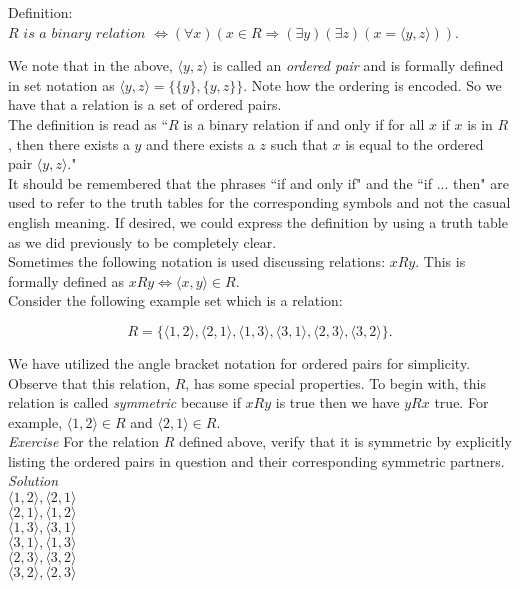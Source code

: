 Definition:  $R \textit{ is a binary relation } \Longleftrightarrow (\forall x) (x \in R \Longrightarrow (\exists y)(\exists z)(x=\langle y,z \rangle))$.

We note that in the above, $\langle y, z \rangle$ is called an \textit{ordered pair} and is formally defined in set notation as $\langle y, z \rangle = \{\{y\}, \{y,z\}\}$.  Note how the ordering is encoded.  So we have that a relation is a set of ordered pairs.\\

The definition is read as ``$R$ is a binary relation if and only if for all $x$ if $x$ is in $R$, then there exists a $y$ and there exists a $z$ such that $x$ is equal to the ordered pair $\langle y, z \rangle$." \\

It should be remembered that the phrases ``if and only if" and the ``if ... then" are used to refer to the truth tables for the corresponding symbols and not the casual english meaning.  If desired, we could express the definition by using a truth table as we did previously to be completely clear.\\

Sometimes the following notation is used discussing relations: $x R y$.  This is formally defined as $x R y \Longleftrightarrow \langle x,y \rangle \in R$.\\

Consider the following example set which is a relation:

\begin{displaymath}
R=\{\langle 1,2 \rangle, \langle 2,1 \rangle,  \langle 1,3 \rangle,  \langle 3,1 \rangle,  \langle 2,3 \rangle,  \langle 3,2 \rangle \}.
\end{displaymath}

We have utilized the angle bracket notation for ordered pairs for simplicity.  Observe that this relation, $R$, has some special properties.  To begin with, this relation is called \textit{symmetric} because if $x R y$ is true then we have $y R x$ true.  For example, $\langle 1, 2 \rangle \in R $ and $\langle 2, 1 \rangle \in R$.\\

\textit{Exercise} For the relation $R$ defined above, verify that it is symmetric by explicitly listing the ordered pairs in question and their corresponding symmetric partners.\\

\textit{Solution}\\
$\langle 1, 2 \rangle, \langle 2, 1 \rangle$  \\
$\langle 2, 1 \rangle, \langle 1, 2 \rangle$  \\
$\langle 1, 3 \rangle, \langle 3, 1 \rangle$  \\
$\langle 3, 1 \rangle, \langle 1, 3 \rangle$  \\
$\langle 2, 3 \rangle, \langle 3, 2 \rangle$  \\
$\langle 3, 2 \rangle, \langle 2, 3 \rangle$  \\ 

